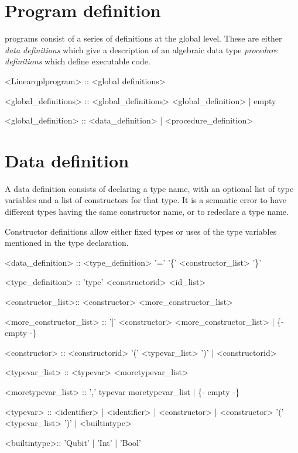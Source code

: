 \section{Program definition}\label{sec:bnfProgramDefinition}
\lqpl{} programs consist of a series of definitions at the
global level. These are either \emph{data definitions} which
give a description of an algebraic data type \emph{procedure definitions}
which define executable code.

\begin{singlespace}
\begin{bnf}
   <Linearqplprogram>   :: <global definitions>
  
   <global_definitions> :: <global_definitions> <global_definition>
        | empty 
  
   <global_definition> :: <data_definition>
        | <procedure_definition>
\end{bnf}
\end{singlespace}

\section{Data definition}\label{sec:bnfDataDefinition}
A data definition consists of declaring a type name, with an optional
list of type variables and a list of constructors for that type. 
It is a semantic error to have different types having the same 
constructor name, or to redeclare a type name. 

Constructor definitions allow either fixed types or uses of the
type variables mentioned in the type declaration. 

\begin{singlespace}
\begin{bnf}
   <data_definition> :: <type_definition> '=' 
                        '\{' <constructor_list> '\}'
  
   <type_definition> :: 'type' <constructorid> <id_list>
  
   <constructor_list>:: <constructor> <more_constructor_list>
      
   <more_constructor_list> :: 
        '|' <constructor> <more_constructor_list>
        | \{- empty -\}
  
   <constructor> :: <constructorid> '(' <typevar_list> ')'
        | <constructorid>
  
   <typevar_list> :: <typevar> <moretypevar_list>
             
   <moretypevar_list> :: ',' typevar moretypevar_list
        | \{- empty -\} 

   <typevar> :: <identifier> 
        | <identifier>
        | <constructor>
        | <constructor> '(' <typevar_list> ')' 
        | <builtintype>

   <builtintype>:: 'Qubit'  | 'Int' | 'Bool'
\end{bnf}
\end{singlespace}

